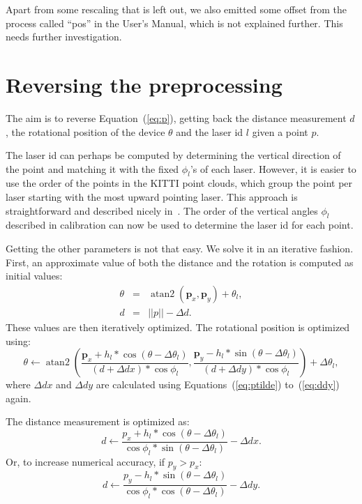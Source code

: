 \documentclass[english]{article}
\DeclareMathOperator*{\atantwo}{atan2}
\begin{document}
Apart from some rescaling that is left out, we also emitted some offset
from the process called ``pos'' in the User's Manual, which is not
explained further. This needs further investigation.


\section{Reversing the preprocessing}
The aim is to reverse Equation~(\ref{eq:p}), getting back the distance
measurement $d$, the rotational position of the device $\theta$ and the
laser id $l$ given a point $p$.

The laser id can perhaps be computed by determining the vertical
direction of the point and matching it with the fixed $\phi_l$'s of each
laser. However, it is easier to use the order of the points in the KITTI
point clouds, which group the point per laser starting with the most
upward pointing laser. This approach is straightforward and described nicely
in~\cite{triess2020}. The order of the vertical angles $\phi_l$ described in calibration
can now be used to determine the laser id for each point.

Getting the other parameters is not that easy. We solve it in
an iterative fashion. First, an approximate value of both the distance and
the rotation is computed as initial values:
\begin{eqnarray}
  \theta &=& \atantwo(\mathbf{p}_x, \mathbf{p}_y) + \theta_l, \\
  d &=& ||p|| - \Delta d.
\end{eqnarray}
These values are then iteratively optimized. The rotational position is optimized using:
\begin{equation}
   \theta \leftarrow \atantwo\left(
                     \frac{\mathbf{p}_x + h_l * \cos(\theta - \Delta \theta_l)}{(d + \Delta dx) * \cos{\phi_l}},
                     \frac{\mathbf{p}_y - h_l * \sin(\theta - \Delta \theta_l)}{(d + \Delta dy) * \cos{\phi_l}}
           \right) + \Delta \theta_l,
   \label{eq:thetait}
\end{equation}
where $\Delta dx$ and $\Delta dy$ are calculated using
Equations~(\ref{eq:ptilde}) to~(\ref{eq:ddy}) again.

The distance measurement is optimized as:
\begin{equation}
    d \leftarrow \frac{p_x + h_l * \cos(\theta - \Delta \theta_l)}{\cos{\phi_l} * \sin(\theta - \Delta \theta_l)} - \Delta dx.  \label{eq:dita}
\end{equation}
Or, to increase numerical accuracy, if $p_y > p_x$:
\begin{equation}
    d \leftarrow \frac{p_y - h_l * \sin(\theta - \Delta \theta_l)}{\cos{\phi_l} * \cos(\theta - \Delta \theta_l)} - \Delta dy.  \label{eq:ditb}
\end{equation}
\end{document}
